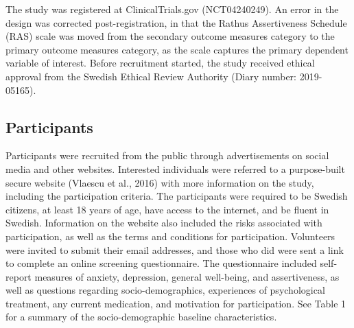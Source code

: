 \documentclass[preprint,
3p]{elsarticle} %
\begin{document}
The study was registered at ClinicalTrials.gov (NCT04240249). An error
in the design was corrected post-registration, in that the Rathus
Assertiveness Schedule (RAS) scale was moved from the secondary outcome
measures category to the primary outcome measures category, as the scale
captures the primary dependent variable of interest. Before recruitment
started, the study received ethical approval from the Swedish Ethical
Review Authority (Diary number: 2019-05165).

\hypertarget{participants}{%
\subsection{Participants}\label{participants}}

Participants were recruited from the public through advertisements on
social media and other websites. Interested individuals were referred to
a purpose-built secure website (Vlaescu et al., 2016) with more
information on the study, including the participation criteria. The
participants were required to be Swedish citizens, at least 18 years of
age, have access to the internet, and be fluent in Swedish. Information
on the website also included the risks associated with participation, as
well as the terms and conditions for participation. Volunteers were
invited to submit their email addresses, and those who did were sent a
link to complete an online screening questionnaire. The questionnaire
included self-report measures of anxiety, depression, general
well-being, and assertiveness, as well as questions regarding
socio-demographics, experiences of psychological treatment, any current
medication, and motivation for participation. See Table 1 for a summary
of the socio-demographic baseline characteristics.
\end{document}
